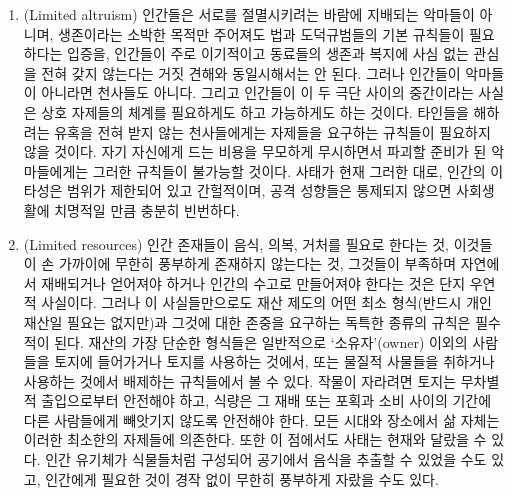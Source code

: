 \begin{enumerate}
  수 있다. 어떤 이들이 이런 점들에서 현재 평균보다 훨씬 높았거나,
  대부분이 그보다 훨씬 낮았기 때문일 수 있다. 그러한 예외적 인간들은
  공격으로 얻을 것이 많고 타인들과의 상호 자제나 타협에서 얻을 것은
  적었을 수 있다. 그러나 근사적 동등성이라는 사실의 중대한 중요성을 보기
  위해 소인들 사이의 거인이라는 공상에 의존할 필요는 없다. 그 중요성은
  국가들 사이에 힘과 취약성에서 거대한 격차들이 존재하거나 존재했던 국제
  생활의 사실들에 의해 더 잘 예시되기 때문이다. 나중에 보겠지만,
  국제법의 단위들 사이의 이러한 불평등은 국제법에 국내법과 그토록 다른
  성격을 부여하고, 그것이 조직화된 강제 체계로 작동할 수 있는 정도를
  제한해 온 것들 가운데 하나이다. \textbf{(p.~196)}
\item
   (Limited altruism) 인간들은 서로를 절멸시키려는
  바람에 지배되는 악마들이 아니며, 생존이라는 소박한 목적만 주어져도
  법과 도덕규범들의 기본 규칙들이 필요하다는 입증을, 인간들이 주로
  이기적이고 동료들의 생존과 복지에 사심 없는 관심을 전혀 갖지 않는다는
  거짓 견해와 동일시해서는 안 된다. 그러나 인간들이 악마들이 아니라면
  천사들도 아니다. 그리고 인간들이 이 두 극단 사이의 중간이라는 사실은
  상호 자제들의 체계를 필요하게도 하고 가능하게도 하는 것이다. 타인들을
  해하려는 유혹을 전혀 받지 않는 천사들에게는 자제들을 요구하는 규칙들이
  필요하지 않을 것이다. 자기 자신에게 드는 비용을 무모하게 무시하면서
  파괴할 준비가 된 악마들에게는 그러한 규칙들이 불가능할 것이다. 사태가
  현재 그러한 대로, 인간의 이타성은 범위가 제한되어 있고 간헐적이며,
  공격 성향들은 통제되지 않으면 사회생활에 치명적일 만큼 충분히
  빈번하다.
\item
   (Limited resources) 인간 존재들이 음식, 의복,
  거처를 필요로 한다는 것, 이것들이 손 가까이에 무한히 풍부하게 존재하지
  않는다는 것, 그것들이 부족하며 자연에서 재배되거나 얻어져야 하거나
  인간의 수고로 만들어져야 한다는 것은 단지 우연적 사실이다. 그러나 이
  사실들만으로도 재산 제도의 어떤 최소 형식(반드시 개인 재산일 필요는
  없지만)과 그것에 대한 존중을 요구하는 독특한 종류의 규칙은 필수적이
  된다. 재산의 가장 단순한 형식들은 일반적으로 ‘소유자’(owner) 이외의
  사람들을 토지에 들어가거나 토지를 사용하는 것에서, 또는 물질적
  사물들을 취하거나 사용하는 것에서 배제하는 규칙들에서 볼 수 있다.
  작물이 자라려면 토지는 무차별적 출입으로부터 안전해야 하고, 식량은 그
  재배 또는 포획과 소비 사이의 기간에 다른 사람들에게 빼앗기지 않도록
  안전해야 한다. 모든 시대와 장소에서 삶 자체는 이러한 최소한의 자제들에
  의존한다. 또한 이 점에서도 사태는 현재와 달랐을 수 있다. 인간 유기체가
  식물들처럼 구성되어 공기에서 음식을 추출할 수 있었을 수도 있고,
  인간에게 필요한 것이 경작 없이 무한히 풍부하게 자랐을 수도 있다.
\end{enumerate}

